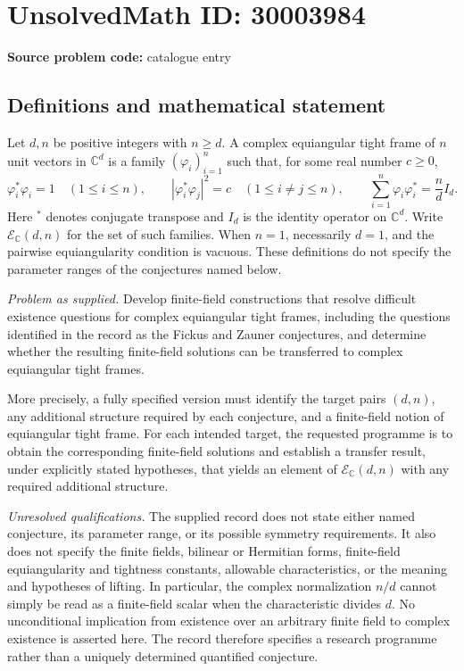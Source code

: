 \documentclass[11pt]{article}
\newcommand{\C}{\mathbb{C}}
\begin{document}
\section*{UnsolvedMath ID: 30003984}
\textbf{Source problem code:} catalogue entry
\subsection{Definitions and mathematical statement}
Let \(d,n\) be positive integers with \(n\ge d\). A complex equiangular tight frame of \(n\) unit vectors in \(\C^d\) is a family \((\varphi_i)_{i=1}^n\) such that, for some real number \(c\ge0\),
\[
\varphi_i^*\varphi_i=1\quad(1\le i\le n),\qquad
|\varphi_i^*\varphi_j|^2=c\quad(1\le i\ne j\le n),\qquad
\sum_{i=1}^n\varphi_i\varphi_i^*=\frac nd I_d.
\]
Here \(^*\) denotes conjugate transpose and \(I_d\) is the identity operator on \(\C^d\). Write \(\mathcal E_{\C}(d,n)\) for the set of such families. When \(n=1\), necessarily \(d=1\), and the pairwise equiangularity condition is vacuous. These definitions do not specify the parameter ranges of the conjectures named below.

\emph{Problem as supplied.} Develop finite-field constructions that resolve difficult existence questions for complex equiangular tight frames, including the questions identified in the record as the Fickus and Zauner conjectures, and determine whether the resulting finite-field solutions can be transferred to complex equiangular tight frames.

More precisely, a fully specified version must identify the target pairs \((d,n)\), any additional structure required by each conjecture, and a finite-field notion of equiangular tight frame. For each intended target, the requested programme is to obtain the corresponding finite-field solutions and establish a transfer result, under explicitly stated hypotheses, that yields an element of \(\mathcal E_{\C}(d,n)\) with any required additional structure.

\emph{Unresolved qualifications.} The supplied record does not state either named conjecture, its parameter range, or its possible symmetry requirements. It also does not specify the finite fields, bilinear or Hermitian forms, finite-field equiangularity and tightness constants, allowable characteristics, or the meaning and hypotheses of lifting. In particular, the complex normalization \(n/d\) cannot simply be read as a finite-field scalar when the characteristic divides \(d\). No unconditional implication from existence over an arbitrary finite field to complex existence is asserted here. The record therefore specifies a research programme rather than a uniquely determined quantified conjecture.
\end{document}
